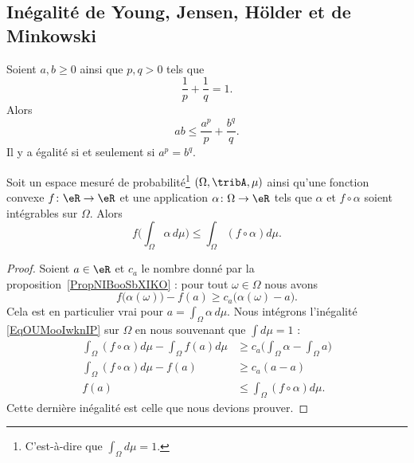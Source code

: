 \subsection{Inégalité de Young, Jensen, Hölder et de Minkowski}

\begin{proposition}     \label{PROPooCQUBooCvtMSi}
	Soient \( a,b\geq 0\) ainsi que \( p,q>0\) tels que
	\begin{equation}
		\frac{1}{ p }+\frac{1}{ q }=1.
	\end{equation}
	Alors
	\begin{equation}
		ab\leq \frac{ a^p }{ p }+\frac{ b^q }{ q }.
	\end{equation}
	Il y a égalité si et seulement si \( a^p=b^q\).
\end{proposition}

\begin{proposition} \label{PropXISooBxdaLk}
	Soit un espace mesuré de probabilité\footnote{C'est-à-dire que \( \int_{\Omega}d\mu=1\).} \( (\Omega,\tribA,\mu)\) ainsi qu'une fonction convexe \( f\colon \eR\to \eR\) et une application \( \alpha\colon \Omega\to \eR\) tels que \( \alpha\) et \( f\circ \alpha\) soient intégrables sur \( \Omega\). Alors
	\begin{equation}
		f\Big( \int_{\Omega}\alpha\,d\mu \Big)\leq \int_{\Omega}(f\circ\alpha) d\mu.
	\end{equation}
\end{proposition}

\begin{proof}
	Soient \( a\in \eR\) et \( c_a\) le nombre donné par la proposition~\ref{PropNIBooSbXIKO} : pour tout \( \omega\in \Omega\) nous avons
	\begin{equation}    \label{EqOUMooIwknIP}
		f\big( \alpha(\omega) \big)-f(a)\geq c_a\big( \alpha(\omega)-a \big).
	\end{equation}
	Cela est en particulier vrai pour \( a=\int_{\Omega}\alpha\,d\mu\). Nous intégrons l'inégalité \eqref{EqOUMooIwknIP} sur \( \Omega\) en nous souvenant que \( \int d\mu=1\) :
	\begin{subequations}
		\begin{align}
			\int_{\Omega}(f\circ \alpha)d\mu-\int_{\Omega}f(a)d\mu & \geq c_a\big( \int_{\Omega}\alpha-\int_{\Omega}a \big) \\
			\int_{\Omega}(f\circ \alpha)d\mu-f(a)                  & \geq c_a(a-a)                                          \\
			f(a)                                                   & \leq \int_{\Omega}(f\circ\alpha)d\mu.
		\end{align}
	\end{subequations}
	Cette dernière inégalité est celle que nous devions prouver.
\end{proof}

